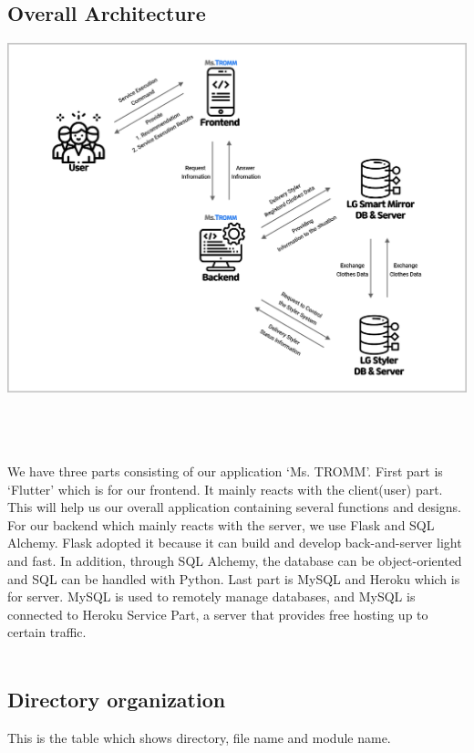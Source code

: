 \documentclass[conference]{IEEEtran}
\begin{document}
\subsection{Overall Architecture}
\centerline{\includegraphics[scale=0.15]{assets/Overall architecture.jpg}}
\\ \\ \\ We have three parts consisting of our application ‘Ms. TROMM’. First part is ‘Flutter’ which is for our frontend. It mainly reacts with the client(user) part. This will help us our overall application containing several functions and designs. For our backend which mainly reacts with the server, we use Flask and SQL Alchemy. Flask adopted it because it can build and develop back-and-server light and fast. In addition, through SQL Alchemy, the database can be object-oriented and SQL can be handled with Python. Last part is MySQL and Heroku which is for server. MySQL is used to remotely manage databases, and MySQL is connected to Heroku Service Part, a server that provides free hosting up to certain traffic.\\ \\

\subsection{Directory organization}
This is the table which shows directory, file name and module name.\\
\end{document}
